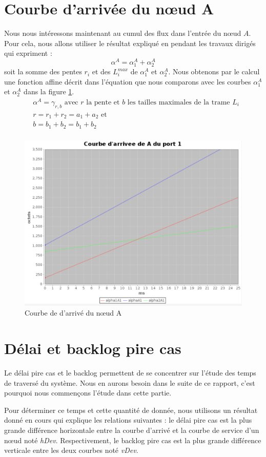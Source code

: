 \section{Courbe d'arrivée du nœud A}
Nous nous intéressons maintenant au cumul des flux dans l'entrée du nœud $A$. Pour cela, nous allons utiliser le résultat expliqué en pendant les travaux dirigés qui expriment : 
\begin{equation}
\alpha^A = \alpha_1^A + \alpha_2^A
\end{equation}
soit la somme des pentes $r_i$ et des $L_i^{max}$ de $\alpha_1^A$ et $\alpha_2^A$. Nous obtenons par le calcul une fonction affine décrit dans l'équation  que nous comparons avec les courbes $\alpha_1^A$ et $\alpha_2^A$ dans la figure \ref{fig:arriveA}.
\begin{align}\label{eqn:arriveA}
&\alpha^A = \gamma_{r,b} \text{ avec $r$ la pente et $b$ les tailles maximales de la trame $L_i$}\\
&r = r_1 + r_2 = a_1 + a_2\text{ et } \\
&b = b_1 + b_2 = b_1 + b_2\\
\end{align}
\begin{figure}[!ht]
\centering
\includegraphics[width = .6\textwidth]{./I/images/arrive_general.png}
\caption{\label{fig:arriveA}Courbe de d'arrivé du nœud A}
\end{figure} 

\section{Délai et backlog pire cas}
Le délai pire cas et le backlog permettent de se concentrer sur l'étude des temps de traversé du système. Nous en aurons besoin dans le suite de ce rapport, c'est pourquoi nous commençons l'étude dans cette partie.

Pour déterminer ce temps et cette quantité de donnée, nous utilisons un résultat donné en cours qui explique les relations suivantes : le délai pire cas est la plus grande différence horizontale entre la courbe d'arrivé et la courbe de service d'un nœud noté \emph{hDev}. Respectivement, le backlog pire cas est la plus grande différence verticale entre les deux courbes noté \emph{vDev}. 

